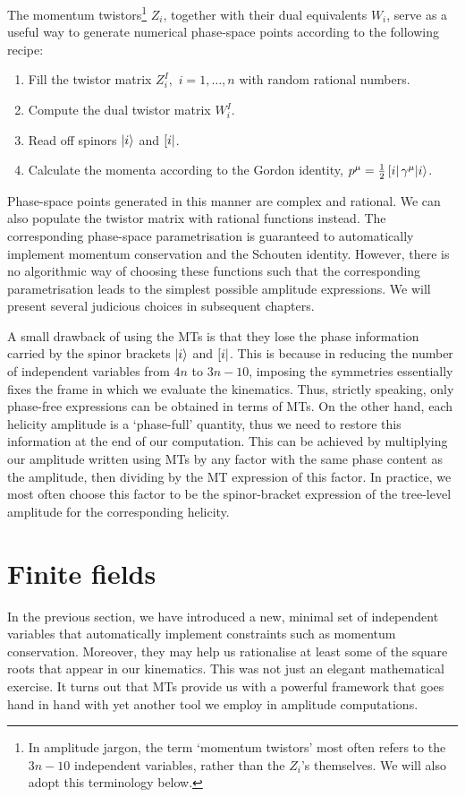 \documentclass[main.tex]{subfiles}
\begin{document}
The momentum twistors\footnote{In amplitude jargon, the term `momentum twistors' most often refers to the $3n-10$ independent variables, rather than the $Z_i$'s themselves. We will also adopt this terminology below.} $Z_i$, together with their dual equivalents $W_i$, serve as a useful way to generate numerical phase-space points according to the following recipe:
\begin{enumerate}
    \item Fill the twistor matrix $Z_i^I,\,\, i=1, \ldots, n$ with random rational numbers.
    \item Compute the dual twistor matrix $W_i^I$.
    \item Read off spinors $|i \rangle$ and $\left[ i \right|$.
    \item Calculate the momenta according to the Gordon identity, $p^\mu = \frac{1}{2}\left[ i \right|\gamma^\mu |i\rangle$.
\end{enumerate}
Phase-space points generated in this manner are complex and rational. We can also populate the twistor matrix with rational functions instead. The corresponding phase-space parametrisation is guaranteed to automatically implement momentum conservation and the Schouten identity. However, there is no algorithmic way of choosing these functions such that the corresponding parametrisation leads to the simplest possible amplitude expressions. We will present several judicious choices in subsequent chapters.

A small drawback of using the MTs is that they lose the phase information carried by the spinor brackets $|i \rangle$ and $\left[ i \right|$. This is because in reducing the number of independent variables from $4n$ to $3n-10$, imposing the symmetries essentially fixes the frame in which we evaluate the kinematics. Thus, strictly speaking, only phase-free expressions can be obtained in terms of MTs. On the other hand, each helicity amplitude is a `phase-full' quantity, thus we need to restore this information at the end of our computation. This can be achieved by multiplying our amplitude written using MTs by any factor with the same phase content as the amplitude, then dividing by the MT expression of this factor. In practice, we most often choose this factor to be the spinor-bracket expression of the tree-level amplitude for the corresponding helicity.
\section{Finite fields} \label{sec:FF}
In the previous section, we have introduced a new, minimal set of independent variables that automatically implement constraints such as momentum conservation. Moreover, they may help us rationalise at least some of the square roots that appear in our kinematics. This was not just an elegant mathematical exercise. It turns out that MTs provide us with a powerful framework that goes hand in hand with yet another tool we employ in amplitude computations.
\end{document}

